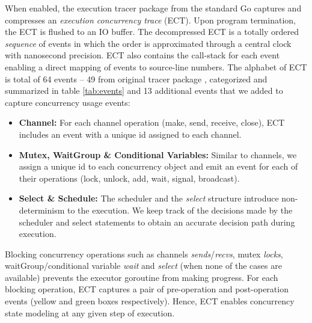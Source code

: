 When enabled, the execution tracer package from the standard Go captures and compresses an \textit{execution concurrency trace} (ECT).
%
Upon program termination, the ECT is flushed to an IO buffer.
%
The decompressed ECT is a totally ordered \textit{sequence} of events in which the order is approximated through a central clock with nanosecond precision.
%
ECT also contains the call-stack for each event enabling a direct mapping of events to source-line numbers.
%
The alphabet of ECT is total of 64 events -- 49 from original tracer package \cite{goParserSource}, categorized and summarized in table \ref{tab:events} and 13 additional events that we added to capture concurrency usage events:
%
\begin{itemize}
    \item \textbf{Channel:} For each channel operation (make, send, receive, close), ECT includes an event with a unique id assigned to each channel.
    \item \textbf{Mutex, WaitGroup \& Conditional Variables:} Similar to channels, we assign a unique id to each concurrency object and emit an event for each of their operations (lock, unlock, add, wait, signal, broadcast).
    \item \textbf{Select \& Schedule:} The scheduler and the \textit{select} structure introduce non-determinism to the execution. We keep track of the decisions made by the scheduler and select statements to obtain an accurate decision path during execution.
\end{itemize}

Blocking concurrency operations such as channels \textit{sends}/\textit{recvs}, mutex \textit{locks}, waitGroup/conditional variable \textit{wait} and \textit{select} (when none of the cases are available) prevents the executor goroutine from making progress.
%
For each blocking operation, ECT captures a pair of pre-operation and post-operation events (yellow and green boxes respectively).
%
Hence, ECT enables concurrency state modeling at any given step of execution.
%

